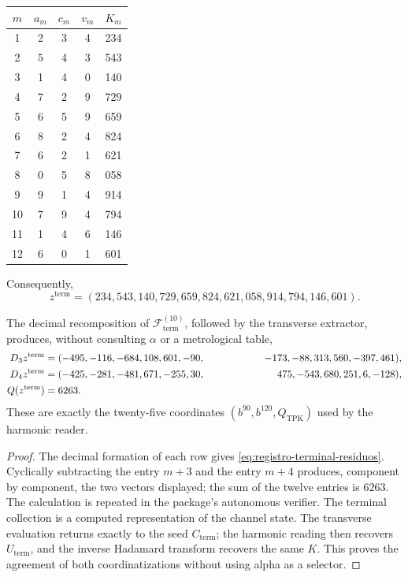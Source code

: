 \begin{center}
\begin{tabular}{c@{\qquad}ccc@{\qquad}c}
\toprule
\(m\)&\(a_m\)&\(c_m\)&\(v_m\)&\(K_m\)\\
\midrule
1&2&3&4&234\\
2&5&4&3&543\\
3&1&4&0&140\\
4&7&2&9&729\\
5&6&5&9&659\\
6&8&2&4&824\\
7&6&2&1&621\\
8&0&5&8&058\\
9&9&1&4&914\\
10&7&9&4&794\\
11&1&4&6&146\\
12&6&0&1&601\\
\bottomrule
\end{tabular}
\end{center}
Consequently,
\begin{equation}
 z^{\mathrm{term}}
 =(234,543,140,729,659,824,621,058,914,794,146,601).
 \label{eq:registro-terminal-residuos}
\end{equation}

\begin{proposition}
\label{prop:registro-terminal-coordenadas}
The decimal recomposition of \(\mathscr F_{\mathrm{term}}^{(10)}\), followed
by the transverse extractor, produces, without consulting \(\alpha\) or a
metrological table,
\begin{align*}
 D_3z^{\mathrm{term}}={}&(-495,-116,-684,108,601,-90,
 &\hspace{18mm}-173,-88,313,560,-397,461),\\
 D_4z^{\mathrm{term}}={}&(-425,-281,-481,671,-255,30,
 &\hspace{18mm}475,-543,680,251,6,-128),\\
 Q(z^{\mathrm{term}})={}&6263.
\end{align*}
These are exactly the twenty-five coordinates
\((b^{90},b^{120},Q_{\mathrm{TPK}})\) used by the harmonic reader.
\end{proposition}

\begin{proof}
The decimal formation of each row gives
\eqref{eq:registro-terminal-residuos}. Cyclically subtracting the entry
\(m+3\) and the entry \(m+4\) produces, component by component, the two
vectors displayed; the sum of the twelve entries is \(6263\). The calculation
is repeated in the package's autonomous verifier. The terminal collection is a
computed representation of the channel state. The transverse evaluation returns
exactly to the seed \(C_{\mathrm{term}}\); the harmonic reading then recovers
\(U_{\mathrm{term}}\), and the inverse Hadamard transform recovers the same
\(K\). This proves the agreement of both coordinatizations without using
alpha as a selector.
\end{proof}

